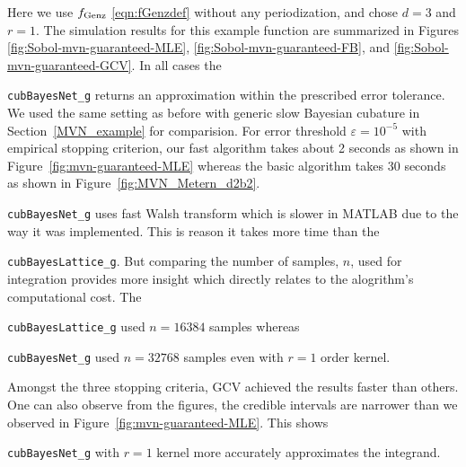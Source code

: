 \documentclass{iitthesis}          %
\newcommand{\code}[1]{\texttt{#1}}
\newcommand\figref{Figure~\ref}
\newcommand\secref{Section~\ref}
\begin{document}
\Subsection{Using \code{cubBayesNet\_g}}
Here we use $ f_{\textup{Genz}}$ \eqref{eqn:fGenzdef} without any periodization, and chose $d=3$ and $r=1$. The simulation results for this example function are summarized in Figures \ref{fig:Sobol-mvn-guaranteed-MLE}, \ref{fig:Sobol-mvn-guaranteed-FB}, and \ref{fig:Sobol-mvn-guaranteed-GCV}.  In all cases the {\code{cubBayesNet\_g} returns an approximation within the prescribed error tolerance. We used the same setting as before with generic slow Bayesian cubature in \secref{MVN_example} for comparision. For error threshold $\varepsilon=10^{-5}$ with empirical stopping criterion, our fast algorithm takes about 2 seconds as shown in \figref{fig:mvn-guaranteed-MLE} whereas the basic algorithm takes 30 seconds as shown in \figref{fig:MVN_Metern_d2b2}. 
{\code{cubBayesNet\_g} uses fast Walsh transform which is slower in MATLAB due to the way it was implemented. This is reason it takes more time than the {\code{cubBayesLattice\_g}. 
But comparing the number of samples, $n$, used for integration provides more insight which directly relates to the alogrithm's computational cost. The {\code{cubBayesLattice\_g} used $n=16384$ samples whereas {\code{cubBayesNet\_g} used $n=32768$ samples even with $r=1$ order kernel.

Amongst the three stopping criteria, GCV achieved the results faster than others. 
One can also observe from the figures, the credible intervals are narrower than we observed in \figref{fig:mvn-guaranteed-MLE}.
This shows {\code{cubBayesNet\_g} with $r=1$ kernel more accurately approximates the integrand.

}}}}}}
\end{document}
